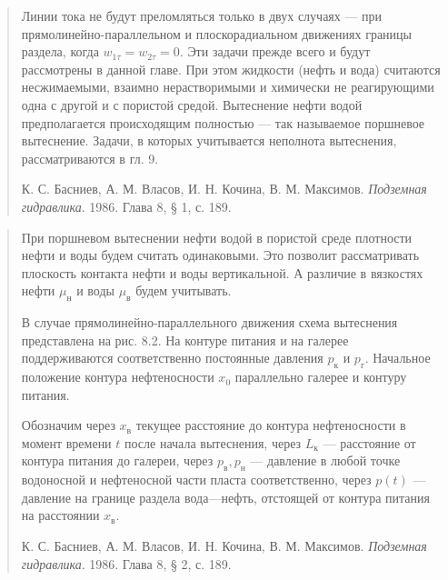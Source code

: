 \documentclass[12pt,a4paper]{article}
\begin{document}
\begin{quote}\sloppy
Линии тока не будут преломляться только в двух случаях --- при прямолинейно-параллельном и плоскорадиальном движениях границы раздела, когда $w_{1\tau}=w_{2\tau}=0$. Эти задачи прежде всего и будут рассмотрены в данной главе. При этом жидкости (нефть и вода) считаются несжимаемыми, взаимно нерастворимыми и химически не реагирующими одна с другой и с пористой средой. Вытеснение нефти водой предполагается происходящим полностью --- так называемое поршневое вытеснение. Задачи, в которых учитывается неполнота вытеснения, рассматриваются в гл. 9.
\par\nobreak\smallskip
{\small К. С. Басниев, А. М. Власов, И. Н. Кочина, В. М. Максимов. \textit{Подземная гидравлика}. 1986. Глава 8, § 1, с. 189.}\par
\end{quote}

\begin{quote}\sloppy
При поршневом вытеснении нефти водой в пористой среде плотности нефти и воды будем считать одинаковыми. Это позволит рассматривать плоскость контакта нефти и воды вертикальной. А различие в вязкостях нефти $\mu_\text{н}$ и воды $\mu_\text{в}$ будем учитывать.

В случае прямолинейно-параллельного движения схема вытеснения представлена на рис. 8.2. На контуре питания и на галерее поддерживаются соответственно постоянные давления $p_\text{к}$ и $p_\text{г}$. Начальное положение контура нефтеносности $x_0$ параллельно галерее и контуру питания.

Обозначим через $x_\text{в}$ текущее расстояние до контура нефтеносности в момент времени $t$ после начала вытеснения, через $L_\text{к}$ --- расстояние от контура питания до галереи, через $p_\text{в},p_\text{н}$ --- давление в любой точке водоносной и нефтеносной части пласта соответственно, через $p(t)$ --- давление на границе раздела вода---нефть, отстоящей от контура питания на расстоянии $x_\text{в}$.
\par\nobreak\smallskip
{\small К. С. Басниев, А. М. Власов, И. Н. Кочина, В. М. Максимов. \textit{Подземная гидравлика}. 1986. Глава 8, § 2, с. 189.}\par
\end{quote}
\end{document}
